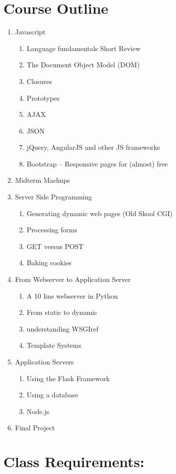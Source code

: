 \documentclass[11pt,twocolumn]{article}
\begin{document}
\section*{Course Outline}
\begin{enumerate}
	\addtolength{\itemsep}{-0.5\baselineskip}
	\item Javascript
	\begin{enumerate}
 		\item Language fundamentals Short Review
		\item The Document Object Model (DOM)
		\item Closures
		\item Prototypes
		\item AJAX
		\item JSON
		\item jQuery, AngularJS and other JS frameworks
        \item Bootstrap -- Responsive pages for (almost) free
	\end{enumerate}
	\item Midterm Mashups
	\item Server Side Programming
\begin{enumerate}
	\item Generating dynamic web pages  (Old Skool CGI)
	\item Processing forms
	\item GET versus POST
	\item Baking cookies
\end{enumerate}
	\item From Webserver to Application Server
	\begin{enumerate}
		\item A 10 line webserver in Python
		\item From static to dynamic
		\item understanding WSGIref
		\item Template Systems
	\end{enumerate}
	\item Application Servers
	\begin{enumerate}
		\item Using the Flask Framework
		\item Using a database
		\item Node.js
	\end{enumerate}
	\item Final Project
\end{enumerate}

\section*{Class Requirements:}
\end{document}
